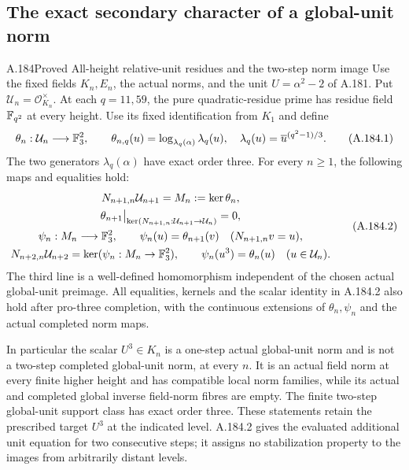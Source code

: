 \subsection{The exact secondary character of a global-unit norm}

\begin{statement}{A.184}{Proved}
{All-height relative-unit residues and the two-step norm image}
Use the fixed fields \(K_n,E_n\), the actual norms, and the unit
\(U=\alpha^2-2\) of A.181.  Put
\(\mathcal U_n=\mathcal O_{K_n}^{\times}\).
At each \(q=11,59\), the pure quadratic-residue prime has
residue field \(\mathbb F_{q^2}\) at every height.  Use its fixed
identification from \(K_1\) and define
\[
 \theta_n:\mathcal U_n\longrightarrow\mathbb F_3^2,\qquad
 \theta_{n,q}(u)=\log_{\lambda_q(\alpha)}\lambda_q(u),
 \quad\lambda_q(u)=\overline u^{(q^2-1)/3}.
\tag{A.184.1}
\]
The two generators \(\lambda_q(\alpha)\) have exact order three.
For every \(n\ge1\), the following maps and equalities hold:
\[
\begin{gathered}
 N_{n+1,n}\mathcal U_{n+1}=M_n:=\ker\theta_n,\\
 \theta_{n+1}\big|_{\ker(N_{n+1,n}:\mathcal U_{n+1}
                                    \to\mathcal U_n)}=0,\\
 \psi_n:M_n\longrightarrow\mathbb F_3^2,\qquad
       \psi_n(u)=\theta_{n+1}(v)\quad(N_{n+1,n}v=u),\\
 N_{n+2,n}\mathcal U_{n+2}=\ker(\psi_n:M_n\to\mathbb F_3^2),
 \qquad \psi_n(u^3)=\theta_n(u)\quad(u\in\mathcal U_n).
\end{gathered}
\tag{A.184.2}
\]
The third line is a well-defined homomorphism independent of the
chosen actual global-unit preimage.  All equalities, kernels and
the scalar identity in A.184.2 also hold after pro-three completion,
with the continuous extensions of \(\theta_n,\psi_n\) and the
actual completed norm maps.

In particular the scalar \(U^3\in K_n\) is a one-step actual
global-unit norm and is not a two-step completed global-unit norm,
at every \(n\).  It is an actual field norm at every finite
higher height and has compatible local norm families, while its
actual and completed global inverse field-norm fibres are empty.
The finite two-step global-unit support class has exact order three.
These statements retain the prescribed target \(U^3\) at the
indicated level.  A.184.2 gives the evaluated additional unit
equation for two consecutive steps; it assigns no stabilization
property to the images from arbitrarily distant levels.
\end{statement}

